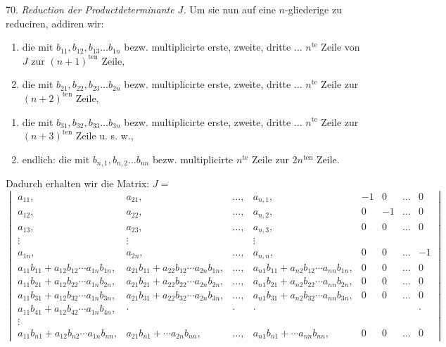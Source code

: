 70. \textit{Reduction der Productdeterminante $J$.} Um sie nun auf eine
$n$-gliederige zu reduciren, addiren wir:
\begin{enumerate}
\item[1)] die mit $b_{11}, b_{12}, b_{13} \dots b_{1n}$ bezw.
multiplicirte erste, zweite, dritte $\dots$ $n^{\text{te}}$ Zeile von
$J$ zur $(n+1)^{\text{ten}}$ Zeile,
\item[2)] die mit $b_{21}, b_{22}, b_{23} \dots b_{2n}$ bezw.
multiplicirte erste, zweite, dritte $\dots$ $n^{\text{te}}$ Zeile zur
$(n+2)^{\text{ten}}$ Zeile,
\end{enumerate}


\begin{enumerate}
\item[3)] die mit $b_{31}, b_{32}, b_{33} \dots b_{3n}$ bezw.
multiplicirte erste, zweite, dritte $\dots$ $n^{\text{te}}$ Zeile zur
$(n+3)^{\text{ten}}$ Zeile u. s. w.,
\item[] endlich: die mit $b_{n,1}, b_{n,2} \dots b_{nn}$ bezw.
multiplicirte $n^{\text{te}}$ Zeile zur $2n^{\text{ten}}$ Zeile.
\end{enumerate}
Dadurch erhalten wir die Matrix: $J=$
\[
\begin{vmatrix}
a_{11}, & a_{21}, & \dots, & a_{n,1}, & -1 & 0 & \dots & 0 \\
a_{12}, & a_{22}, & \dots, & a_{n,2}, & 0 & -1 & \dots & 0 \\
a_{13}, & a_{23}, & \dots, & a_{n,3}, & 0 & 0 & \dots & 0 \\
\vdots & \vdots & & \vdots & & & & \\
a_{1n}, & a_{2n}, & \dots, & a_{n,n}, & 0 & 0 & \dots & -1 \\
a_{11}b_{11}+a_{12}b_{12}\cdots a_{1n}b_{1n}, & a_{21}b_{11}+a_{22}b_{12}\cdots a_{2n}b_{1n}, & \dots, & a_{n1}b_{11}+a_{n2}b_{12}\cdots a_{nn}b_{1n}, & 0 & 0 & \dots & 0 \\
a_{11}b_{21}+a_{12}b_{22}\cdots a_{1n}b_{2n}, & a_{21}b_{21}+a_{22}b_{22}\cdots a_{2n}b_{2n}, & \dots, & a_{n1}b_{21}+a_{n2}b_{22}\cdots a_{nn}b_{2n}, & 0 & 0 & \dots & 0 \\
a_{11}b_{31}+a_{12}b_{32}\cdots a_{1n}b_{3n}, & a_{21}b_{31}+a_{22}b_{32}\cdots a_{2n}b_{3n}, & \dots, & a_{n1}b_{31}+a_{n2}b_{32}\cdots a_{nn}b_{3n}, & 0 & 0 & \dots & 0 \\
a_{11}b_{41}+a_{12}b_{42}\cdots a_{1n}b_{4n}, & \cdot & \cdot & \cdot & & & & \cdot \\
\vdots & & & & & & & \\
a_{11}b_{n1}+a_{12}b_{n2}\cdots a_{1n}b_{nn}, & a_{21}b_{n1}+\cdots a_{2n}b_{nn}, & \dots, & a_{n1}b_{n1}+\cdots a_{nn}b_{nn}, & 0 & 0 & \dots & 0
\end{vmatrix}
\] %
